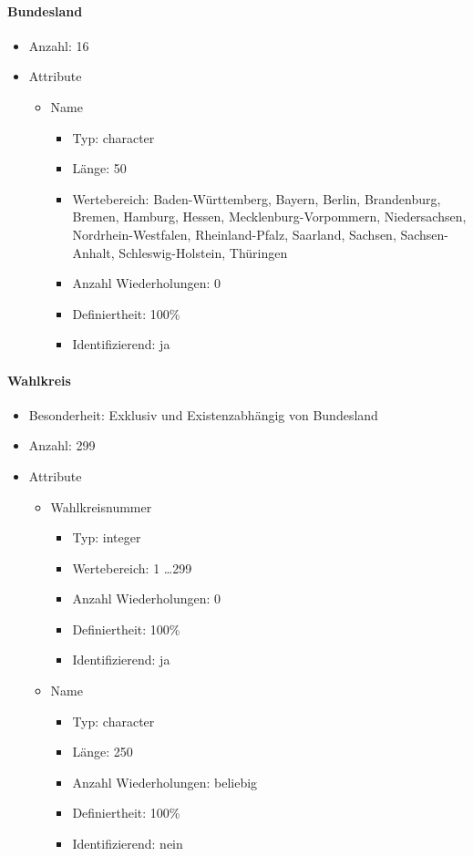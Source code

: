 \documentclass[a4paper]{article}
\begin{document}
\paragraph{Bundesland}
\begin{itemize}
\item Anzahl: 16
\item Attribute
	\begin{itemize}
	\item Name
	\begin{itemize}
		\item Typ: character
		\item Länge: 50
		\item Wertebereich: Baden-Württemberg, Bayern, Berlin, Brandenburg, Bremen, Hamburg, Hessen, Mecklenburg-Vorpommern, Niedersachsen, Nordrhein-Westfalen, Rheinland-Pfalz, Saarland, Sachsen, Sachsen-Anhalt, Schleswig-Holstein, Thüringen
		\item Anzahl Wiederholungen: 0
		\item Definiertheit: 100\%
		\item Identifizierend: ja
		\end{itemize}
	\end{itemize}
\end{itemize}

\paragraph{Wahlkreis}
\begin{itemize}
\item Besonderheit: Exklusiv und Existenzabhängig von Bundesland
\item Anzahl: 299
\item Attribute
	\begin{itemize}
	\item Wahlkreisnummer
		\begin{itemize}
		\item Typ: integer
		\item Wertebereich: 1 \ldots 299
		\item Anzahl Wiederholungen: 0
		\item Definiertheit: 100\%
		\item Identifizierend: ja
		\end{itemize}
	\item Name
		\begin{itemize}
		\item Typ: character
		\item Länge: 250
		\item Anzahl Wiederholungen: beliebig
		\item Definiertheit: 100\%
		\item Identifizierend: nein
		\end{itemize}
	\end{itemize}
\end{itemize}
\end{document}
